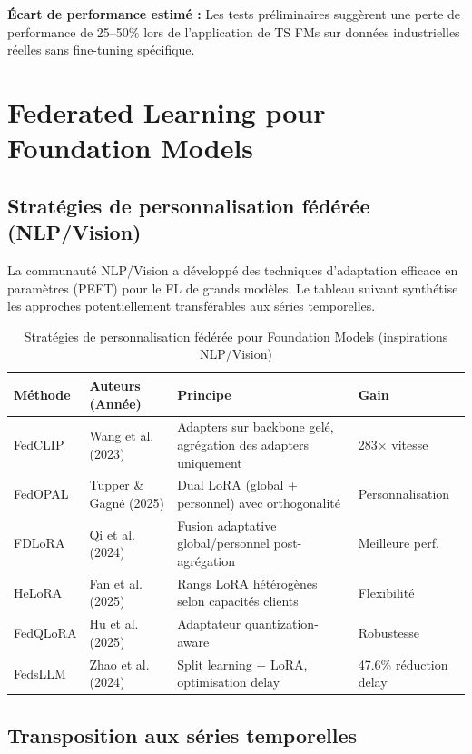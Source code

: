 \documentclass[12pt, a4paper]{report}
\begin{document}
\begin{infobox}
\textbf{Écart de performance estimé :} Les tests préliminaires suggèrent une perte de
performance de 25--50\% lors de l'application de TS FMs sur données industrielles réelles
sans fine-tuning spécifique.
\end{infobox}

\section{Federated Learning pour Foundation Models}

\subsection{Stratégies de personnalisation fédérée (NLP/Vision)}

La communauté NLP/Vision a développé des techniques d'adaptation efficace en paramètres
(PEFT) pour le FL de grands modèles. Le tableau suivant synthétise les approches
potentiellement transférables aux séries temporelles.

\begin{table}[h!]
\centering
\caption{Stratégies de personnalisation fédérée pour Foundation Models (inspirations NLP/Vision)}
\label{tab:peft-strategies}
\renewcommand{\arraystretch}{1.6}
\begin{tabularx}{\textwidth}{lp{3cm}Xl}
\toprule
\textbf{Méthode} & \textbf{Auteurs (Année)} & \textbf{Principe} & \textbf{Gain} \\
\midrule
FedCLIP & Wang et al. (2023) & Adapters sur backbone gelé, agrégation des adapters uniquement & 283$\times$ vitesse \\
FedOPAL & Tupper \& Gagné (2025) & Dual LoRA (global + personnel) avec orthogonalité & Personnalisation \\
FDLoRA & Qi et al. (2024) & Fusion adaptative global/personnel post-agrégation & Meilleure perf. \\
HeLoRA & Fan et al. (2025) & Rangs LoRA hétérogènes selon capacités clients & Flexibilité \\
FedQLoRA & Hu et al. (2025) & Adaptateur quantization-aware & Robustesse \\
FedsLLM & Zhao et al. (2024) & Split learning + LoRA, optimisation delay & 47.6\% réduction delay \\
\bottomrule
\end{tabularx}
\end{table}

\subsection{Transposition aux séries temporelles}
\end{document}
